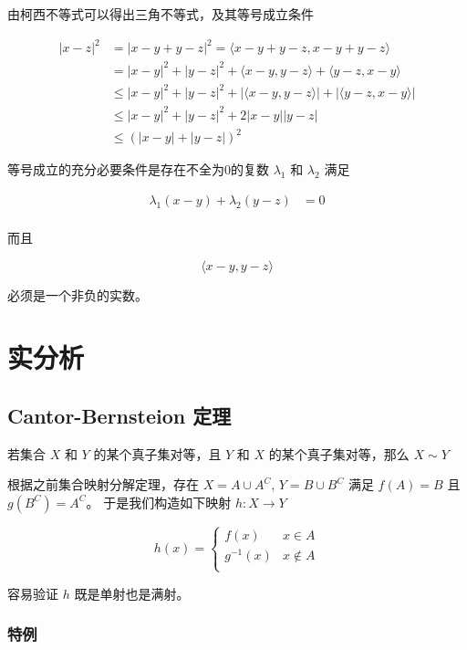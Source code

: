 \documentclass[12pt,a4paper]{ctexart}
\begin{document}
由柯西不等式可以得出三角不等式，及其等号成立条件

\begin{align*}
    \lvert x - z\rvert^2 &= \lvert x - y + y -z \rvert^2 = \langle x-y + y-z, x-y+ y-z \rangle \\ 
    &= \lvert x-y \rvert^2 + \lvert y-z\rvert^2 + \langle x-y, y-z \rangle + \langle y-z, x-y \rangle \\
    & \le \lvert x-y \rvert^2 + \lvert y-z\rvert^2 + \lvert\langle x-y, y-z \rangle\rvert + \lvert\langle y-z, x-y \rangle \rvert \\
    & \le \lvert x-y \rvert^2 + \lvert y-z \rvert^2 + 2 \lvert x-y \rvert \lvert y-z \rvert \\
    & \le  (\lvert x-y \rvert + \lvert y-z \rvert)^2
\end{align*}

等号成立的充分必要条件是存在不全为0的复数 $\lambda_1$ 和 $\lambda_2$ 满足

\begin{align*}
\lambda_1 (x-y) + \lambda_2 (y-z) &= 0 \\
\end{align*}

而且

\[
\langle x-y, y-z\rangle
\]

必须是一个非负的实数。

\section{实分析}

\subsection{Cantor-Bernsteion 定理}

若集合 $X$ 和 $Y$ 的某个真子集对等，且 $Y$ 和 $X$ 的某个真子集对等，那么 $X \sim Y$

根据之前集合映射分解定理，存在 $X = A \cup A^C,\, Y = B \cup B^C$ 满足 $f(A) = B$ 且 $g(B^C) = A^C$。
于是我们构造如下映射 $h: X \to Y$

\[
h(x) = \begin{cases}
    f(x) & x \in A \\
    g^{-1}(x) & x \notin A \\
\end{cases}
\]

容易验证 $h$ 既是单射也是满射。

\subsubsection{特例}
\end{document}
